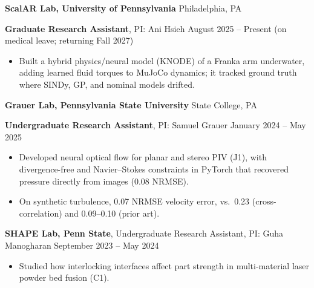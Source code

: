 \textbf{ScalAR Lab, University of Pennsylvania} \hfill Philadelphia, PA

\textbf{Graduate Research Assistant}, PI: Ani Hsieh \hfill August 2025 -- Present (on medical leave; returning Fall 2027)
\begin{itemize}[noitemsep, topsep=0pt, partopsep=0pt, parsep=0pt]
    \item Built a hybrid physics/neural model (KNODE) of a Franka arm underwater, adding learned fluid torques to MuJoCo dynamics; it tracked ground truth where SINDy, GP, and nominal models drifted.
\end{itemize}

\vspace{4pt}

\textbf{Grauer Lab, Pennsylvania State University} \hfill State College, PA

\textbf{Undergraduate Research Assistant}, PI: Samuel Grauer \hfill January 2024 -- May 2025
\begin{itemize}[noitemsep, topsep=0pt, partopsep=0pt, parsep=0pt]
    \item Developed neural optical flow for planar and stereo PIV (J1), with divergence-free and Navier--Stokes constraints in PyTorch that recovered pressure directly from images (0.08 NRMSE).

    \item On synthetic turbulence, 0.07 NRMSE velocity error, vs.\ 0.23 (cross-correlation) and 0.09--0.10 (prior art).
\end{itemize}

\vspace{4pt}

\textbf{SHAPE Lab, Penn State}, Undergraduate Research Assistant, PI: Guha Manogharan \hfill September 2023 -- May 2024
\begin{itemize}[noitemsep, topsep=0pt, partopsep=0pt, parsep=0pt]
    \item Studied how interlocking interfaces affect part strength in multi-material laser powder bed fusion (C1).
\end{itemize}
